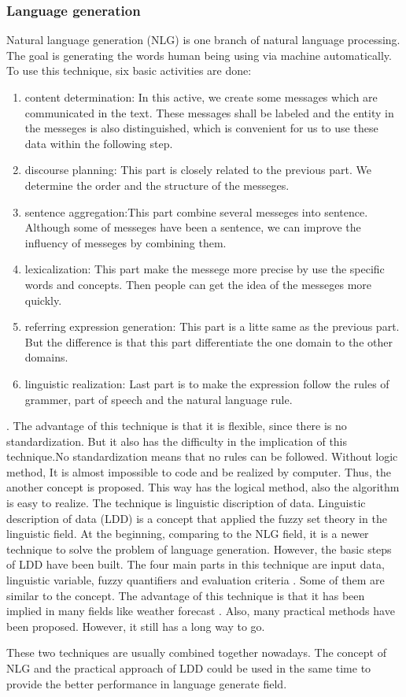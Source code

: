 \subsubsection*{Language generation}

Natural language generation (NLG) is one branch of natural language processing. 
The goal is generating the words human being using via machine automatically. 
To use this technique, six basic activities are done: 
\begin{enumerate}
	\item content determination: In this active, we create some messages which are communicated in the text. 
	These messages shall be labeled and the entity in the messeges is also distinguished, which is convenient for us to use these data within the following step.
	\item discourse planning: This part is closely related to the previous part. 
	We determine the order and the structure of the messeges.
	\item sentence aggregation:This part combine several messeges into sentence. 
	Although some of messeges have been a sentence, we can improve the influency of messeges by combining them.
	\item lexicalization: This part make the messege more precise by use the specific words and concepts. 
	Then people can get the idea of the messeges more quickly.
	\item referring expression generation: This part is a litte same as the previous part. 
	But the difference is that this part differentiate the one domain to the other domains.
	\item linguistic realization: Last part is to make the expression follow the rules of grammer, part of speech and the natural language rule.
\end{enumerate}
\cite{aramossoto2016onthe}. The advantage of this technique is that it is flexible, since there is no standardization. 
But it also has the difficulty in the implication of this technique.\cite{aramossoto2016onthe}No standardization means that no rules can be followed. 
Without logic method, It is almost impossible to code and be realized by computer.
Thus, the another concept is proposed. This way has the logical method, also the algorithm is easy to realize.
The technique is linguistic discription of data.
Linguistic description of data (LDD) is a concept that applied the fuzzy set theory in the linguistic field. 
At the beginning, comparing to the NLG field, it is a newer technique to solve the problem of language generation. 
However, the basic steps of LDD have been built. 
The four main parts in this technique are input data, linguistic variable, fuzzy quantifiers and evaluation criteria \cite{aramossoto2016onthe}. 
Some of them are similar to the concept. 
The advantage of this technique is that it has been implied in many fields like weather forecast \cite{Ramos-SotoBBT14}. 
Also, many practical methods have been proposed. However, it still has a long way to go.

These two techniques are usually combined together nowadays. The concept of NLG and the practical approach of LDD could be used in the same time to provide the better performance in language generate field.

\newpage %